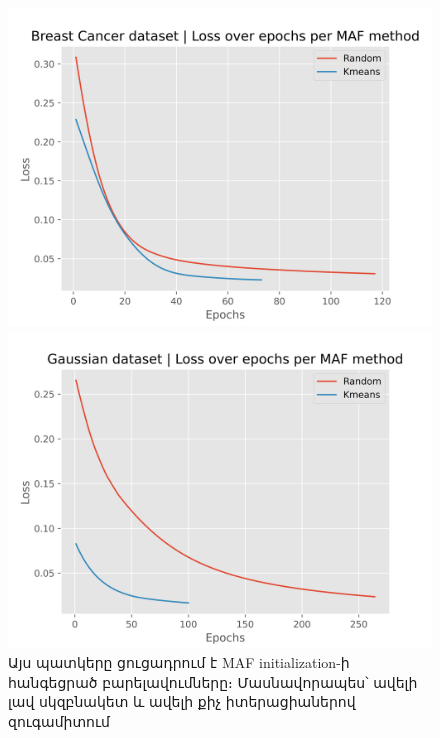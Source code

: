 \documentclass[aspectratio=169]{beamer}
\begin{document}
\begin{frame}
    \begin{figure}
    \centering
    \begin{minipage}{0.49\textwidth}
        \includegraphics[width=\linewidth]{breast-cancer-wisconsin_loss.png} %
    \end{minipage}\hfill
    \begin{minipage}{0.49\textwidth}
        \includegraphics[width=\linewidth]{gaussian_df_loss.png} %
    \end{minipage}
    \caption{Այս պատկերը ցուցադրում է {\rm MAF initialization}-ի հանգեցրած բարելավումները։ Մասնավորապես՝ ավելի լավ սկզբնակետ և ավելի քիչ իտերացիաներով զուգամիտում}
    \label{fig:side_by_side}
\end{figure}
\end{frame}
\end{document}
